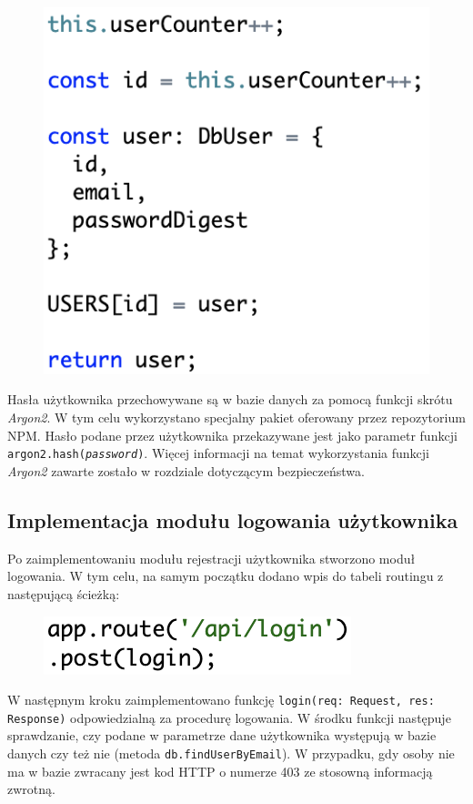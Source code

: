 \begin{figure}[H]
	\includegraphics[scale=0.7]{images/code/new_user.png}
\end{figure}

Hasła użytkownika przechowywane są w bazie danych za pomocą funkcji skrótu \textit{Argon2}. W tym celu wykorzystano specjalny pakiet oferowany przez repozytorium NPM. Hasło podane przez użytkownika przekazywane jest jako parametr funkcji \texttt{argon2.hash(\textit{password})}. Więcej informacji na temat wykorzystania funkcji \textit{Argon2} zawarte zostało w rozdziale dotyczącym bezpieczeństwa. 

\subsection{Implementacja modułu logowania użytkownika}
Po zaimplementowaniu modułu rejestracji użytkownika stworzono moduł logowania. W tym celu, na samym początku dodano wpis do tabeli routingu z następującą ścieżką:

\begin{figure}[H]
	\includegraphics[scale=0.7]{images/code/app_route_login.png}
\end{figure}

W następnym kroku zaimplementowano funkcję \texttt{login(req: Request, res: Response)} odpowiedzialną za procedurę logowania. W środku funkcji następuje sprawdzanie, czy podane w parametrze dane użytkownika występują w bazie danych czy też nie (metoda \texttt{db.findUserByEmail}). W przypadku, gdy osoby nie ma w bazie zwracany jest kod HTTP o numerze 403 ze stosowną informacją zwrotną. 

